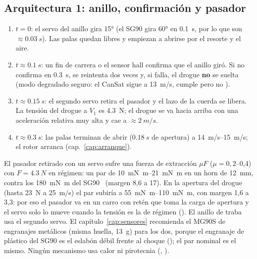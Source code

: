 \subsection{Arquitectura 1: anillo, confirmación y pasador}
\begin{enumerate}[leftmargin=*]
  \item $t=0$: el servo del anillo gira \ang{15} (el SG90 gira \ang{60} en \SI{0.1}{s}, por lo
        que son $\approx\SI{0.03}{s}$). Las palas quedan libres y empiezan a abrirse por el
        resorte y el aire.
  \item $t\approx\SI{0.1}{s}$: un fin de carrera o el sensor hall confirma que el anillo giró.
        Si no confirma en \SI{0.3}{s}, se reintenta dos veces y, si falla, el drogue
        \textbf{no} se suelta (modo degradado seguro: el CanSat sigue a \SI{13}{m/s}, cumple
         pero no ).
  \item $t\approx\SI{0.15}{s}$: el segundo servo retira el pasador y el lazo de la cuerda se
        libera. La tensión del drogue a $V_1$ es \SI{4.3}{N}; el drogue se va hacia arriba
        con una aceleración relativa muy alta y cae a $\approx\SI{2}{m/s}$.
  \item $t\approx\SI{0.3}{s}$: las palas terminan de abrir ($\SI{0.18}{s}$ de apertura) a
        \SIrange{14}{15}{m/s}; el rotor arranca (cap.~\ref{cap:arranque}).
\end{enumerate}
El pasador retirado con un servo sufre una fuerza de extracción $\mu F$ ($\mu=0{,}2$--0,4)
con $F=\SI{4.3}{N}$ en régimen: un par de \SIrange{10}{21}{mN.m} en un horn de \SI{12}{mm},
contra los \SI{180}{mN.m} del SG90~\cite{arq-sg90} (margen 8,6 a 17). En la apertura del
drogue (hasta \SI{23}{N} a \SI{25}{m/s}) el par subiría a \SIrange{55}{110}{mN.m}, con margen
1,6 a 3,3: por eso el pasador va en un carro con retén que toma la carga de apertura y el
servo solo lo mueve cuando la tensión es la de régimen (). El anillo de traba usa el
segundo servo. El capítulo~\ref{cap:sensores} recomienda el MG90S de engranajes metálicos (misma huella, \SI{13}{g}) para los dos, porque el
engranaje de plástico del SG90 es el eslabón débil frente al choque (); el par nominal es el mismo. Ningún mecanismo usa calor ni pirotecnia (, ).

